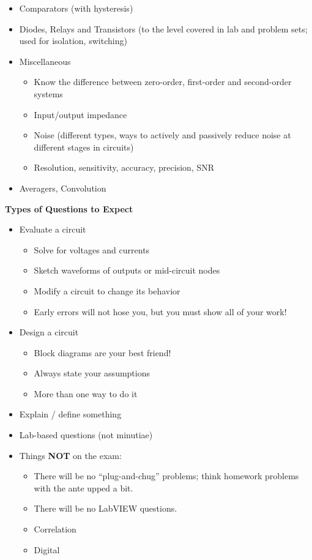 \documentclass[10pt]{report}
\begin{document}
\begin{itemize}
\item Comparators (with hysteresis)

\item Diodes, Relays and Transistors (to the level covered in lab and problem sets; used for isolation, switching) 

\item Miscellaneous
\begin{itemize}
    \item Know the difference between zero-order, first-order and second-order systems
    \item Input/output impedance
    \item Noise (different types, ways to actively and passively reduce noise at different stages in circuits)
    \item Resolution, sensitivity, accuracy, precision, SNR
\end{itemize}

\item Averagers, Convolution

\end{itemize}

{\bf Types of Questions to Expect}
\begin{itemize}
    \item Evaluate a circuit
    \begin{itemize}
        \item Solve for voltages and currents
        \item Sketch waveforms of outputs or mid-circuit nodes
        \item Modify a circuit to change its behavior
        \item Early errors will not hose you, but you must show all of your work!
    \end{itemize}
    \item Design a circuit
    \begin{itemize}
        \item Block diagrams are your best friend!
        \item Always state your assumptions
        \item More than one way to do it
    \end{itemize}
    \item Explain / define something
    \item Lab-based questions (not minutiae)
    \item Things {\bf NOT} on the exam:
    \begin{itemize}
        \item There will be no ``plug-and-chug'' problems; think homework problems with the ante upped a bit.
        \item There will be no LabVIEW questions.
        \item Correlation
        \item Digital
    \end{itemize}
\end{itemize}
\end{document}

